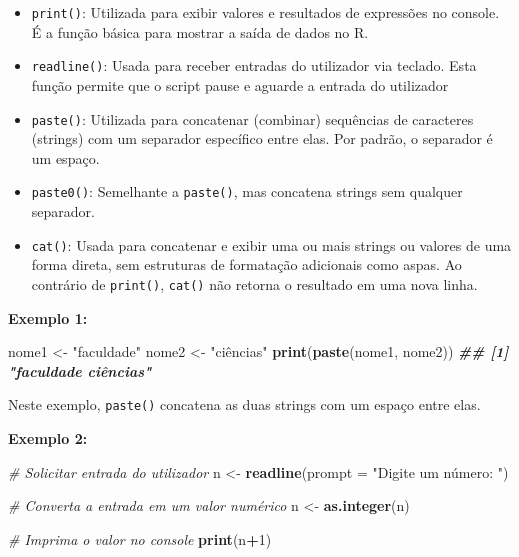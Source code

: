 \documentclass[
]{book}
\newenvironment{Shaded}{\begin{snugshade}}{\end{snugshade}}
\newcommand{\AttributeTok}[1]{\textcolor[rgb]{0.13,0.29,0.53}{#1}}
\newcommand{\CommentTok}[1]{\textcolor[rgb]{0.56,0.35,0.01}{\textit{#1}}}
\newcommand{\DecValTok}[1]{\textcolor[rgb]{0.00,0.00,0.81}{#1}}
\newcommand{\DocumentationTok}[1]{\textcolor[rgb]{0.56,0.35,0.01}{\textbf{\textit{#1}}}}
\newcommand{\FunctionTok}[1]{\textcolor[rgb]{0.13,0.29,0.53}{\textbf{#1}}}
\newcommand{\NormalTok}[1]{#1}
\newcommand{\OtherTok}[1]{\textcolor[rgb]{0.56,0.35,0.01}{#1}}
\newcommand{\SpecialCharTok}[1]{\textcolor[rgb]{0.81,0.36,0.00}{\textbf{#1}}}
\newcommand{\StringTok}[1]{\textcolor[rgb]{0.31,0.60,0.02}{#1}}
\begin{document}
\begin{itemize}
\item
  \texttt{print()}: Utilizada para exibir valores e resultados de expressões
  no console. É a função básica para mostrar a saída de dados no R.
\item
  \texttt{readline()}: Usada para receber entradas do utilizador via teclado.
  Esta função permite que o script pause e aguarde a entrada do
  utilizador
\item
  \texttt{paste()}: Utilizada para concatenar (combinar) sequências de
  caracteres (strings) com um separador específico entre elas. Por
  padrão, o separador é um espaço.
\item
  \texttt{paste0()}: Semelhante a \texttt{paste()}, mas concatena strings sem
  qualquer separador.
\item
  \texttt{cat()}: Usada para concatenar e exibir uma ou mais strings ou
  valores de uma forma direta, sem estruturas de formatação adicionais
  como aspas. Ao contrário de \texttt{print()}, \texttt{cat()} não retorna o
  resultado em uma nova linha.
\end{itemize}

\textbf{Exemplo 1:}

\begin{Shaded}
\begin{Highlighting}[]
\NormalTok{nome1 }\OtherTok{\textless{}{-}} \StringTok{"faculdade"}
\NormalTok{nome2 }\OtherTok{\textless{}{-}} \StringTok{"ciências"}
\FunctionTok{print}\NormalTok{(}\FunctionTok{paste}\NormalTok{(nome1, nome2))}
\DocumentationTok{\#\# [1] "faculdade ciências"}
\end{Highlighting}
\end{Shaded}

Neste exemplo, \texttt{paste()} concatena as duas strings com um espaço entre
elas.

\textbf{Exemplo 2:}

\begin{Shaded}
\begin{Highlighting}[]
\CommentTok{\# Solicitar entrada do utilizador}
\NormalTok{n }\OtherTok{\textless{}{-}} \FunctionTok{readline}\NormalTok{(}\AttributeTok{prompt =} \StringTok{"Digite um número: "}\NormalTok{)}

\CommentTok{\# Converta a entrada em um valor numérico}
\NormalTok{n }\OtherTok{\textless{}{-}} \FunctionTok{as.integer}\NormalTok{(n)}

\CommentTok{\# Imprima o valor no console}
\FunctionTok{print}\NormalTok{(n}\SpecialCharTok{+}\DecValTok{1}\NormalTok{)}
\end{Highlighting}
\end{Shaded}
\end{document}
